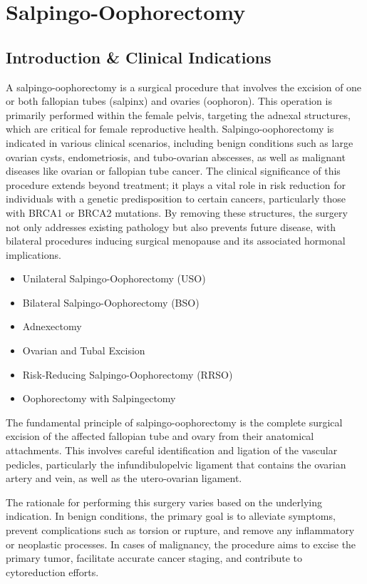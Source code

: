\chapter{Salpingo-Oophorectomy}

\section*{Introduction \& Clinical Indications}
A salpingo-oophorectomy is a surgical procedure that involves the excision of one or both fallopian tubes (salpinx) and ovaries (oophoron). This operation is primarily performed within the female pelvis, targeting the adnexal structures, which are critical for female reproductive health. Salpingo-oophorectomy is indicated in various clinical scenarios, including benign conditions such as large ovarian cysts, endometriosis, and tubo-ovarian abscesses, as well as malignant diseases like ovarian or fallopian tube cancer. The clinical significance of this procedure extends beyond treatment; it plays a vital role in risk reduction for individuals with a genetic predisposition to certain cancers, particularly those with BRCA1 or BRCA2 mutations. By removing these structures, the surgery not only addresses existing pathology but also prevents future disease, with bilateral procedures inducing surgical menopause and its associated hormonal implications.

\begin{itemize}
  \item Unilateral Salpingo-Oophorectomy (USO)
  \item Bilateral Salpingo-Oophorectomy (BSO)
  \item Adnexectomy
  \item Ovarian and Tubal Excision
  \item Risk-Reducing Salpingo-Oophorectomy (RRSO)
  \item Oophorectomy with Salpingectomy
\end{itemize}

The fundamental principle of salpingo-oophorectomy is the complete surgical excision of the affected fallopian tube and ovary from their anatomical attachments. This involves careful identification and ligation of the vascular pedicles, particularly the infundibulopelvic ligament that contains the ovarian artery and vein, as well as the utero-ovarian ligament. 

The rationale for performing this surgery varies based on the underlying indication. In benign conditions, the primary goal is to alleviate symptoms, prevent complications such as torsion or rupture, and remove any inflammatory or neoplastic processes. In cases of malignancy, the procedure aims to excise the primary tumor, facilitate accurate cancer staging, and contribute to cytoreduction efforts.

